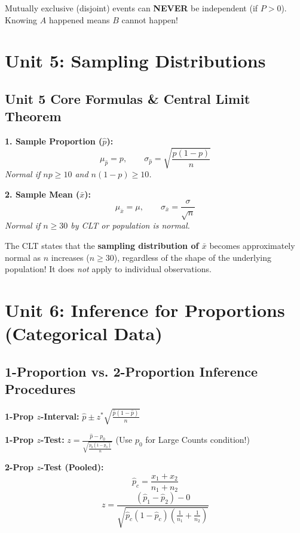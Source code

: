 \documentclass[11pt,oneside,openany]{book}
\begin{document}
\begin{trapbox}
Mutually exclusive (disjoint) events can \textbf{NEVER} be independent (if $P > 0$). Knowing $A$ happened means $B$ cannot happen!
\end{trapbox}

\chapter{Unit 5: Sampling Distributions}

\section{Unit 5 Core Formulas \& Central Limit Theorem}
\begin{formulabox}
\textbf{1. Sample Proportion ($\hat{p}$):}
$$\mu_{\hat{p}} = p, \qquad \sigma_{\hat{p}} = \sqrt{\frac{p(1-p)}{n}}$$
\emph{Normal if $np \ge 10$ and $n(1-p) \ge 10$.}

\textbf{2. Sample Mean ($\bar{x}$):}
$$\mu_{\bar{x}} = \mu, \qquad \sigma_{\bar{x}} = \frac{\sigma}{\sqrt{n}}$$
\emph{Normal if $n \ge 30$ by CLT or population is normal.}
\end{formulabox}

\begin{mnemonicbox}
The CLT states that the \textbf{sampling distribution of $\bar{x}$} becomes approximately normal as $n$ increases ($n \ge 30$), regardless of the shape of the underlying population! It does \emph{not} apply to individual observations.
\end{mnemonicbox}

\chapter{Unit 6: Inference for Proportions (Categorical Data)}

\section{1-Proportion vs. 2-Proportion Inference Procedures}
\begin{formulabox}
\textbf{1-Prop $z$-Interval:} $\hat{p} \pm z^* \sqrt{\frac{\hat{p}(1-\hat{p})}{n}}$

\textbf{1-Prop $z$-Test:} $z = \frac{\hat{p} - p_0}{\sqrt{\frac{p_0(1-p_0)}{n}}}$ (Use $p_0$ for Large Counts condition!)

\textbf{2-Prop $z$-Test (Pooled):}
$$\hat{p}_c = \frac{x_1 + x_2}{n_1 + n_2}$$
$$z = \frac{(\hat{p}_1 - \hat{p}_2) - 0}{\sqrt{\hat{p}_c(1-\hat{p}_c)\left(\frac{1}{n_1} + \frac{1}{n_2}\right)}}$$
\end{formulabox}
\end{document}
